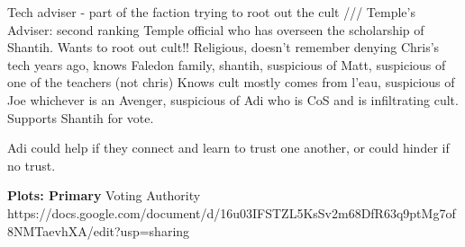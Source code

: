 \documentclass[char]{GL2020}
\begin{document}
\name{\cAntiChup{}}










Tech adviser - part of the faction trying to root out the cult /// 
Temple's Adviser: second ranking Temple official who has overseen the scholarship of Shantih.  Wants to root out cult!! 	Religious, doesn't remember denying Chris's tech years ago, knows Faledon family, shantih, suspicious of Matt, suspicious of one of the teachers (not chris) Knows cult mostly comes from l'eau, suspicious of Joe whichever is an Avenger, suspicious of Adi who is CoS and is infiltrating cult.  Supports Shantih for vote.

Adi could help if they connect and learn to trust one another, or could hinder if no trust.


\textbf{Plots: Primary}
Voting Authority
https://docs.google.com/document/d/16u03IFSTZL5KsSv2m68DfR63q9ptMg7of8NMTaevhXA/edit?usp=sharing
\end{document}
